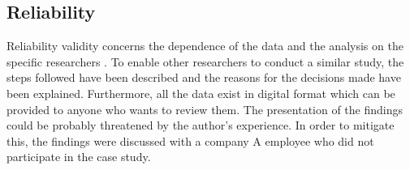 \subsection{Reliability}
Reliability validity concerns the dependence of the data and the analysis on the specific researchers \cite{Wohlin}. To enable other researchers to conduct a similar study, the steps followed have been described and the reasons for the decisions made have been explained. Furthermore, all the data exist in digital format which can be provided to anyone who wants to review them. The presentation of the findings could be probably threatened by the author's experience. In order to mitigate this, the findings were discussed with a company A employee who did not participate in the case study.





